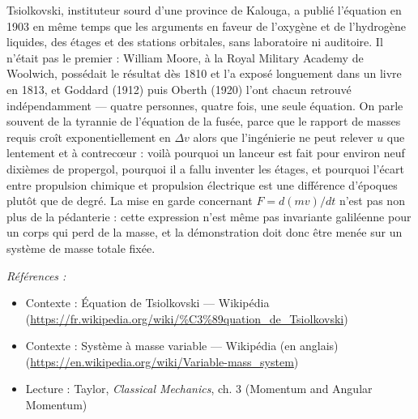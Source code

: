 \documentclass[11pt]{article}
\newenvironment{refs}{\par\small\noindent\emph{Références :}\begin{itemize}\setlength\itemsep{0pt}}{\end{itemize}\normalsize}
\begin{document}
\noindent Tsiolkovski, instituteur sourd d'une province de Kalouga, a publié l'équation
en 1903 en même temps que les arguments en faveur de l'oxygène et de l'hydrogène liquides, des
étages et des stations orbitales, sans laboratoire ni auditoire. Il n'était pas le premier :
William Moore, à la Royal Military Academy de Woolwich, possédait le résultat dès 1810 et l'a
exposé longuement dans un livre en 1813, et Goddard (1912) puis Oberth (1920) l'ont chacun
retrouvé indépendamment --- quatre personnes, quatre fois, une seule équation. On parle souvent de
la tyrannie de l'équation de la fusée, parce que le rapport de masses requis croît
exponentiellement en $ \Delta v $ alors que l'ingénierie ne peut relever $ u $ que lentement
et à contrec\oe{}ur : voilà pourquoi un lanceur est fait pour environ neuf dixièmes de propergol,
pourquoi il a fallu inventer les étages, et pourquoi l'écart entre propulsion chimique et
propulsion électrique est une différence d'époques plutôt que de degré. La mise en garde
concernant $ F = d(mv)/dt $ n'est pas non plus de la pédanterie : cette expression n'est même
pas invariante galiléenne pour un corps qui perd de la masse, et la démonstration doit donc être
menée sur un système de masse totale fixée.

\begin{refs}
\item Contexte : Équation de Tsiolkovski --- Wikipédia (\url{https://fr.wikipedia.org/wiki/%C3%89quation_de_Tsiolkovski})
\item Contexte : Système à masse variable --- Wikipédia (en anglais) (\url{https://en.wikipedia.org/wiki/Variable-mass_system})
\item Lecture : Taylor, \textit{Classical Mechanics}, ch. 3 (Momentum and Angular Momentum)
\end{refs}

\bigskip
\end{document}
